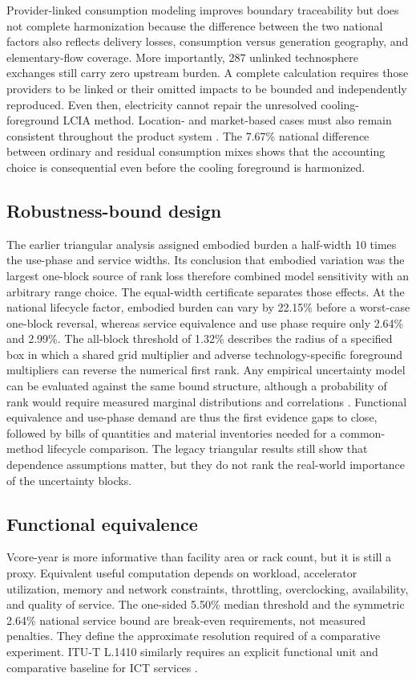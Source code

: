 \documentclass[review,a4paper,fleqn]{cas-sc}
\begin{document}
Provider-linked consumption modeling improves boundary traceability but does not complete harmonization because the difference between the two national factors also reflects delivery losses, consumption versus generation geography, and elementary-flow coverage. More importantly, 287 unlinked technosphere exchanges still carry zero upstream burden. A complete calculation requires those providers to be linked or their omitted impacts to be bounded and independently reproduced. Even then, electricity cannot repair the unresolved cooling-foreground LCIA method. Location- and market-based cases must also remain consistent throughout the product system \cite{ref22,ref23}. The 7.67\% national difference between ordinary and residual consumption mixes shows that the accounting choice is consequential even before the cooling foreground is harmonized.

\subsection{Robustness-bound design}
The earlier triangular analysis assigned embodied burden a half-width 10 times the use-phase and service widths. Its conclusion that embodied variation was the largest one-block source of rank loss therefore combined model sensitivity with an arbitrary range choice. The equal-width certificate separates those effects. At the national lifecycle factor, embodied burden can vary by 22.15\% before a worst-case one-block reversal, whereas service equivalence and use phase require only 2.64\% and 2.99\%. The all-block threshold of 1.32\% describes the radius of a specified box in which a shared grid multiplier and adverse technology-specific foreground multipliers can reverse the numerical first rank. Any empirical uncertainty model can be evaluated against the same bound structure, although a probability of rank would require measured marginal distributions and correlations \cite{ref30}. Functional equivalence and use-phase demand are thus the first evidence gaps to close, followed by bills of quantities and material inventories needed for a common-method lifecycle comparison. The legacy triangular results still show that dependence assumptions matter, but they do not rank the real-world importance of the uncertainty blocks.

\subsection{Functional equivalence}
Vcore-year is more informative than facility area or rack count, but it is still a proxy. Equivalent useful computation depends on workload, accelerator utilization, memory and network constraints, throttling, overclocking, availability, and quality of service. The one-sided 5.50\% median threshold and the symmetric 2.64\% national service bound are break-even requirements, not measured penalties. They define the approximate resolution required of a comparative experiment. ITU-T L.1410 similarly requires an explicit functional unit and comparative baseline for ICT services \cite{ref18}.
\end{document}
